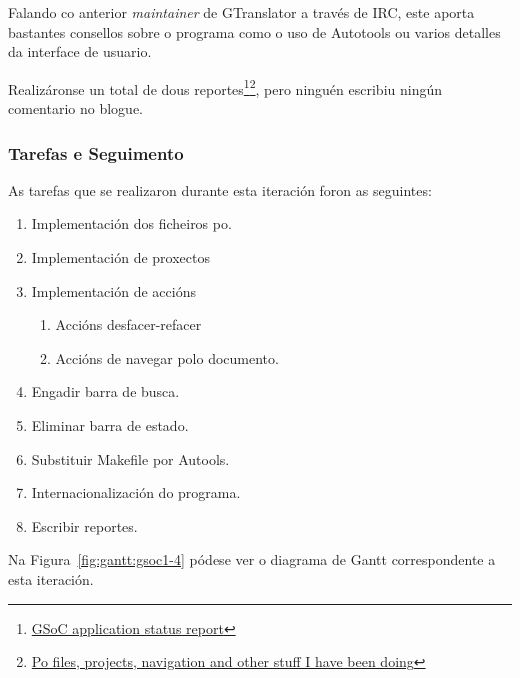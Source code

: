 Falando co anterior \emph{maintainer} de GTranslator a través de IRC, este aporta bastantes consellos sobre o programa como o uso de Autotools ou varios detalles da interface de usuario.

Realizáronse un total de dous reportes\footnote{\href{http://aquelando.info/gsoc-application-status-report/}{GSoC application status report}}\footnote{\href{http://aquelando.info/po-files-projects-navigation-and-other-stuff-i-have-been-doing/}{Po files, projects, navigation and other stuff I have been doing}}, pero ninguén escribiu ningún comentario no blogue.

\subsubsection{Tarefas e Seguimento}

As tarefas que se realizaron durante esta iteración foron as seguintes:

\begin{enumerate}[label=\bfseries WBS 4.\arabic*]
  \item Implementación dos ficheiros po.
  \item Implementación de proxectos
  \item Implementación de accións
    \begin{enumerate}[label=\bfseries WBS 4.3.\arabic*]
      \item Accións desfacer-refacer
      \item Accións de navegar polo documento.
    \end{enumerate}
  \item Engadir barra de busca.
  \item Eliminar barra de estado.
  \item Substituir Makefile por Autools.
  \item Internacionalización do programa.
  \item Escribir reportes.
\end {enumerate}

Na Figura~\ref{fig:gantt:gsoc1-4} pódese ver o diagrama de Gantt correspondente a esta iteración.

